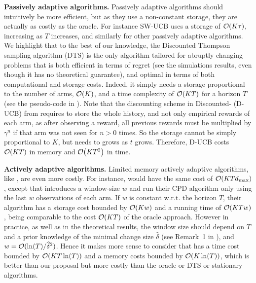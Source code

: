 \textbf{Passively adaptive algorithms.}
%
Passively adaptive algorithms should intuitively be more efficient, but as they use a non-constant storage, they are actually as costly as the oracle.
For instance SW-UCB uses a storage of $\mathop{}\mathopen{}\mathcal{O}\mathopen{}\left(K \tau\right)$, increasing as $T$ increases, and similarly for other passively adaptive algorithms.
We highlight that to the best of our knowledge, the Discounted Thompson sampling algorithm (DTS) is the only algorithm tailored for abruptly changing problems that is both efficient in terms of regret (see the simulations results, even though it has no theoretical guarantee), and optimal in terms of both computational and storage costs. Indeed, it simply needs a storage proportional to the number of arms, $\mathop{}\mathopen{}\mathcal{O}\mathopen{}\left(K\right)$, and a time complexity of $\mathop{}\mathopen{}\mathcal{O}\mathopen{}\left(KT\right)$ for a horizon $T$ (see the pseudo-code in \cite{RajKalyani17}).
Note that the discounting scheme in Discounted-\UCB{} (D-UCB) from \cite{Kocsis06} requires to store the whole history, and not only empirical rewards of each arm, as after observing a reward, all previous rewards must be multiplied by $\gamma^n$ if that arm was not seen for $n>0$ times. So the storage cannot be simply proportional to $K$, but needs to grows as $t$ grows.
Therefore, D-UCB costs $\mathop{}\mathopen{}\mathcal{O}\mathopen{}\left(K T\right)$ in memory and $\mathop{}\mathopen{}\mathcal{O}\mathopen{}\left(K T^2\right)$ in time.


\textbf{Actively adaptive algorithms.}
%
Limited memory actively adaptive algorithms, like \MUCB, are even more costly.
For instance, \MUCB{} would have the same cost of $\mathop{}\mathopen{}\mathcal{O}\mathopen{}\left(K T d_{\max}\right)$, except that \cite{CaoZhenKvetonXie18} introduces a window-size $w$ and run their CPD algorithm only using the last $w$ observations of each arm. If $w$ is constant w.r.t. the horizon $T$, their algorithm has a storage cost bounded by $\mathop{}\mathopen{}\mathcal{O}\mathopen{}\left(K w\right)$ and a running time of $\mathop{}\mathopen{}\mathcal{O}\mathopen{}\left(K T w\right)$, being comparable to the cost $\mathop{}\mathopen{}\mathcal{O}\mathopen{}\left(K T\right)$ of the oracle approach.
However in practice, as well as in the theoretical results, the window size should depend on $T$ and a prior knowledge of the minimal change size $\widehat{\delta}$ (see Remark~1 in \cite{CaoZhenKvetonXie18}), and $w = \mathcal{O}(\ln(T) / \widehat{\delta}^2)$.
Hence it makes more sense to consider that \MUCB{} has a time cost bounded by $\mathop{}\mathopen{}\mathcal{O}\mathopen{}\left(K T \ln(T)\right)$ and a memory costs bounded by $\mathop{}\mathopen{}\mathcal{O}\mathopen{}\left(K \ln(T)\right)$, which is better than our proposal but more costly than the oracle or DTS or stationary algorithms.



